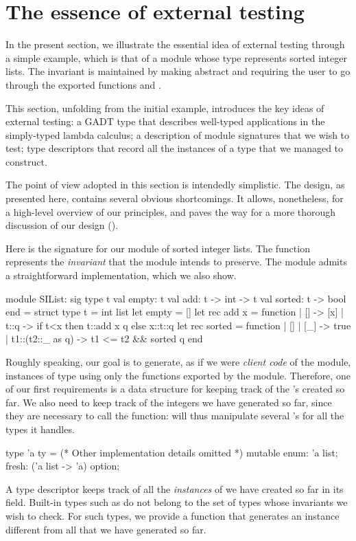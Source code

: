 \section{The essence of external testing}
\label{sec:essence}

In the present section, we illustrate the essential idea of external testing
through a simple example, which is that of a module  whose type
 represents sorted integer lists. The invariant is maintained by making
 abstract and requiring the user to go through the exported functions
 and .

This section, unfolding from the initial example, introduces the key ideas of
external testing: a GADT type that describes well-typed applications in the
simply-typed lambda calculus; a description of module signatures that we wish to
test; type descriptors that record all the instances of a type that we managed
to construct.

The point of view adopted in this section is intendedly simplistic. The design,
as presented here, contains several obvious shortcomings. It allows,
nonetheless, for a high-level overview of our principles, and paves the way for
a more thorough discussion of our design ().

Here is the signature for our module of sorted integer lists.
The  function represents the \emph{invariant} that the module
intends to preserve. The module admits a straightforward implementation, which
we also show.
%
\begin{ocamlcode}
module SIList: sig
  type t
  val empty: t
  val add: t -> int -> t
  val sorted: t -> bool
end = struct
  type t = int list
  let empty = []
  let rec add x = function
    | [] -> [x]
    | t::q -> if t<x then t::add x q else x::t::q
  let rec sorted = function
    | [] | [_] -> true
    | t1::(t2::_ as q) -> t1 <= t2 && sorted q
end
\end{ocamlcode}
%
Roughly speaking, our goal is to generate, as if we were \emph{client code} of
the module, instances of type  using only the functions exported by the
module. Therefore, one of our first requirements is a data structure for keeping
track of the 's created so far. We also need to keep track of the
integers we have generated so far, since they are necessary to call the
 function: \arti will thus manipulate several 's for all the
types it handles.
%
\begin{ocamlcode}
type 'a ty = { (* Other implementation details omitted *)
  mutable enum: 'a list;
  fresh: ('a list -> 'a) option; }
\end{ocamlcode}
%
A type descriptor  keeps track of all the \emph{instances} of
 we have created so far in its  field. Built-in types such
as  do not belong to the set of types whose invariants we wish to
check. For such types, we provide a  function that generates an
instance different from all that we have generated so far.

